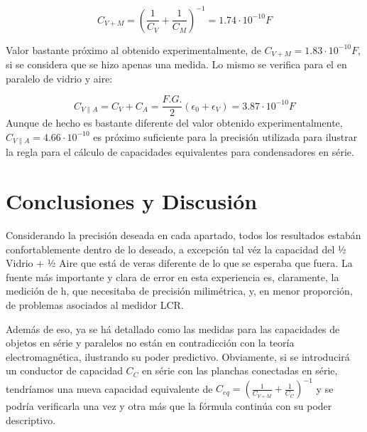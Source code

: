 \documentclass[a4paper,12pt]{article}
\begin{document}
$$C_{V+M} =\left(\frac{1}{C_V} +\frac{1}{C_M} \right)^{-1} =1.74 \cdot 10^{-10}F$$

Valor bastante próximo al obtenido experimentalmente, de $C_{V+M} = 1.83\cdot 10^{-10}F$, si se considera que se hizo apenas una medida. Lo mismo se verifica para el en paralelo de vidrio y aire:

$$C_{V\parallel A} = C_V + C_A = \frac{F.G.}{2} \left( \epsilon_0+\epsilon_V \right) = 3.87\cdot 10^{-10}F$$
 Aunque de hecho es bastante diferente del valor obtenido experimentalmente,$C_{V\parallel A} = 4.66\cdot 10^{-10}$ es próximo suficiente para la precisión utilizada para ilustrar la regla para el cálculo de capacidades equivalentes para condensadores en série.

\section{Conclusiones y Discusión}
Considerando la precisión deseada en cada apartado, todos los resultados estabán confortablemente dentro de lo deseado, a excepción tal véz la capacidad del ½ Vidrio + ½ Aire que está de veras diferente de lo que se esperaba que fuera. La fuente más importante y clara de error en esta experiencia es, claramente, la medición de h, que necesitaba de precisión milimétrica, y, en menor proporción, de problemas asociados al medidor LCR.

Además de eso, ya se há detallado como las medidas para las capacidades de objetos en série y paralelos no están en contradicción con la teoría electromagnética, ilustrando su poder predictivo. Obviamente, si se introducirá un conductor de capacidad $C_C$ en série con las planchas conectadas en série, tendríamos una nueva capacidad equivalente de $C_{eq} = \left(\frac{1}{C_{V+M}} +\frac{1}{C_C} \right)^{-1}$ y se podría verificarla una vez y otra más que la fórmula continúa con su poder descriptivo. 

\printbibliography
\end{document}
